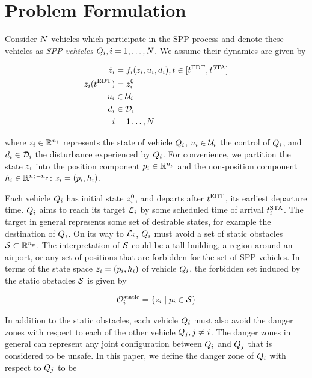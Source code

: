 \section{Problem Formulation \label{sec:formulation}}
Consider $N$ vehicles which participate in the SPP process and denote these vehicles as \textit{SPP vehicles} $Q_{i}, i = 1, \ldots, N$. We assume their dynamics are given by

\begin{equation}
\begin{aligned}
\dot{z}_i &= f_i(z_i, u_i, d_i), t \in [t^\text{EDT}, t^\text{STA}] \\
z_i(t^\text{EDT}) &= z^0_i \\
u_i &\in \mathcal{U}_i \\
d_i &\in \mathcal{D}_i \\
i &= 1 \ldots, N
\end{aligned}
\end{equation}

\noindent where $z_i \in \mathbb{R}^{n_i}$ represents the state of vehicle $Q_{i}$, $u_i \in \mathcal{U}_i$ the control of $Q_{i}$, and $d_i \in \mathcal{D}_i$ the disturbance experienced by $Q_{i}$. For convenience, we partition the state $z_i$ into the position component $p_i \in \mathbb{R}^{n_p}$ and the non-position component $h_i \in \mathbb{R}^{n_i - n_p}$: $z_i = (p_i, h_i)$.

Each vehicle $Q_{i}$ has initial state $z^0_i$, and departs after $t^\text{EDT}$, its earliest departure time. $Q_{i}$ aims to reach its target $\mathcal{L}_i$ by some scheduled time of arrival $t^\text{STA}_i$. The target in general represents some set of desirable states, for example the destination of $Q_{i}$. On its way to $\mathcal{L}_i$, $Q_{i}$ must avoid a set of static obstacles $\mathcal{S} \subset \mathbb{R}^{n_p}$. The interpretation of $\mathcal{S}$ could be a tall building, a region around an airport, or any set of positions that are forbidden for the set of SPP vehicles. In terms of the state space $z_i = (p_i, h_i)$ of vehicle $Q_{i}$, the forbidden set induced by the static obstacles $\mathcal{S}$ is given by

\begin{equation}
\begin{aligned}
\mathcal{O}^\text{static}_i = \{z_i \mid p_i \in \mathcal{S}\}
\end{aligned}
\end{equation}

In addition to the static obstacles, each vehicle $Q_{i}$ must also avoid the danger zones with respect to each of the other vehicle $Q_{j}, j\neq i$. The danger zones in general can represent any joint configuration between $Q_{i}$ and $Q_{j}$ that is considered to be unsafe. In this paper, we define the danger zone of $Q_{i}$ with respect to $Q_{j}$ to be

